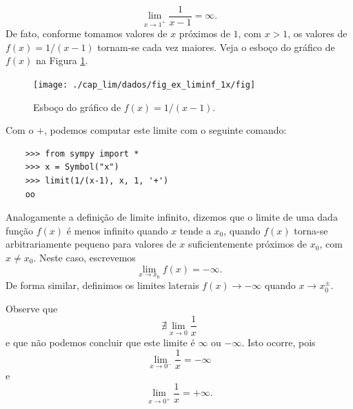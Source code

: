 \begin{ex}
  \begin{equation}
    \lim_{x\to 1^+} \frac{1}{x-1} = \infty.
  \end{equation}
  De fato, conforme tomamos valores de $x$ próximos de $1$, com $x>1$, os valores de $f(x) = 1/(x-1)$ tornam-se cada vez maiores. Veja o esboço do gráfico de $f(x)$ na Figura \ref{fig:ex_liminf_1x}.

\begin{figure}[H]
  \centering
  \texttt{[image: ./cap\_lim/dados/fig\_ex\_liminf\_1x/fig]}
  \caption{Esboço do gráfico de $f(x)=1/(x-1)$.}
  \label{fig:ex_liminf_1x}
\end{figure}  

\ifispython
  Com o {\python}+{\sympy}, podemos computar este limite com o seguinte comando:
  \begin{lstlisting}
    >>> from sympy import *
    >>> x = Symbol("x")
    >>> limit(1/(x-1), x, 1, '+')
    oo
  \end{lstlisting}
\fi
\end{ex}


Analogamente a definição de limite infinito, dizemos que o limite de uma dada função $f(x)$ é menos infinito quando $x$ tende a $x_0$, quando $f(x)$ torna-se arbitrariamente pequeno para valores de $x$ suficientemente próximos de $x_0$, com $x\neq x_0$. Neste caso, escrevemos
\begin{equation}
  \lim_{x\to x_0} f(x) = -\infty.
\end{equation}
De forma similar, definimos os limites laterais $f(x)\to -\infty$ quando $x\to x_0^{\pm}$.

\begin{ex}
  Observe que
  \begin{equation}
    \nexists \lim_{x\to 0} \frac{1}{x}
  \end{equation}
  e que não podemos concluir que este limite é $\infty$ ou $-\infty$. Isto ocorre, pois
  \begin{equation}
    \lim_{x\to 0^-} \frac{1}{x} = -\infty
  \end{equation}
  e
  \begin{equation}
    \lim_{x\to 0^+} \frac{1}{x} = +\infty.
  \end{equation}
\end{ex}

